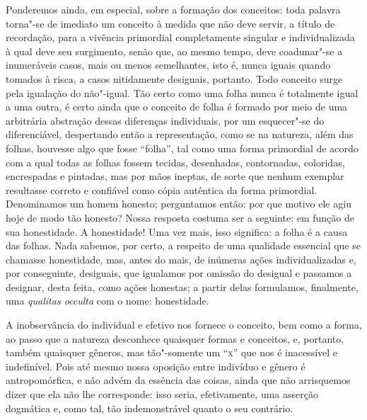 Ponderemos ainda, em especial, sobre a formação dos conceitos: toda palavra
torna"-se de imediato um conceito à medida que não deve servir, a
título de recordação, para a vivência primordial completamente singular
e individualizada à qual deve seu surgimento, senão que, ao mesmo
tempo, deve coadunar"-se a inumeráveis casos, mais ou menos
semelhantes, isto é, nunca iguais quando tomados à risca, a casos
nitidamente desiguais, portanto. Todo conceito surge pela igualação do
não"-igual. Tão certo como uma folha nunca é totalmente igual a uma
outra, é certo ainda que o conceito de folha é formado por meio de uma
arbitrária abstração dessas diferenças individuais, por um
esquecer"-se do diferenciável, despertando então a representação, como se
na natureza, além das folhas, houvesse algo que fosse “folha”, tal como uma
forma primordial de acordo com a qual todas as folhas fossem tecidas,
desenhadas, contornadas, coloridas, encrespadas e pintadas, mas por
mãos ineptas, de sorte que nenhum exemplar resultasse correto e
confiável como cópia autêntica da forma primordial. Denominamos um
homem honesto; perguntamos então: por que motivo ele agiu hoje de modo
tão honesto? Nossa resposta costuma ser a seguinte: em função de sua
honestidade. A honestidade! Uma vez mais, isso significa: a folha é a
causa das folhas. Nada sabemos, por certo, a respeito de uma qualidade
essencial que se chamasse honestidade, mas, antes do mais, de
inúmeras ações individualizadas e, por conseguinte, desiguais, que
igualamos por omissão do desigual e passamos a designar, desta feita,
como ações honestas; a partir delas formulamos, finalmente, uma
\textit{qualitas occulta} com o nome: honestidade.

A inobservância do individual e efetivo nos fornece o conceito, bem como
a forma, ao passo que a natureza desconhece quaisquer formas e
conceitos, e, portanto, também quaisquer gêneros, mas tão"-somente um
``\textsc{x}'' que nos é inacessível e indefinível. Pois até mesmo nossa oposição
entre indivíduo e gênero é antropomórfica, e não advém da essência das
coisas, ainda que não arrisquemos dizer que ela não lhe corresponde:
isso seria, efetivamente, uma asserção dogmática e, como tal, tão
indemonstrável quanto o seu contrário.

